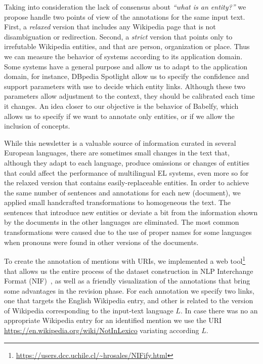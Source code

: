 \documentclass{llncs}
\begin{document}
Taking into consideration the lack of consensus about \textit{``what is an entity?''} we propose handle two points of view of the annotations for the same input text. First, a \textit{relaxed} version that includes any Wikipedia page that is not disambiguation or redirection. Second, a \textit{strict} version that points only to irrefutable Wikipedia entities, and that are person, organization or place. Thus we can measure the behavior of systems according to its application domain. Some systems have a general purpose and allow us to adapt to the application domain, for instance, DBpedia Spotlight allow us to specify the confidence and support parameters with use to decide which entity links. Although these two parameters allow adjustment to the context, they should be calibrated each time it changes. An idea closer to our objective is the behavior of Babelfy, which allows us to specify if we want to annotate only entities, or if we allow the inclusion of concepts.

While this newsletter is a valuable source of information curated in several European languages, there are sometimes small changes in the text that, although they adapt to each language, produce omissions or changes of entities that could affect the performance of multilingual EL systems, even more so for the relaxed version that contains easily-replaceable entities. In order to achieve the same number of sentences and annotations for each new (document), we applied small handcrafted transformations to homogeneous the text. The sentences that introduce new entities or deviate a bit from the information shown by the documents in the other languages are eliminated. The most common transformations were caused due to the use of proper names for some languages when pronouns were found in other versions of the documents. 

To create the annotation of mentions with URIs, we implemented a web tool\footnote{\url{https://users.dcc.uchile.cl/~hrosales/NIFify.html}} that allows us the entire process of the dataset construction in NLP Interchange Format (NIF)~\cite{nif2013}, as well as a friendly visualization of the annotations that bring some advantages in the revision phase. For each annotation we specify two links, one that targets the English Wikipedia entry, and other is related to the version of Wikipedia corresponding to the input-text language $L$. In case there was no an appropriate Wikipedia entry for an identified mention we use the URI \url{https://en.wikipedia.org/wiki/NotInLexico} variating according $L$.
\end{document}
